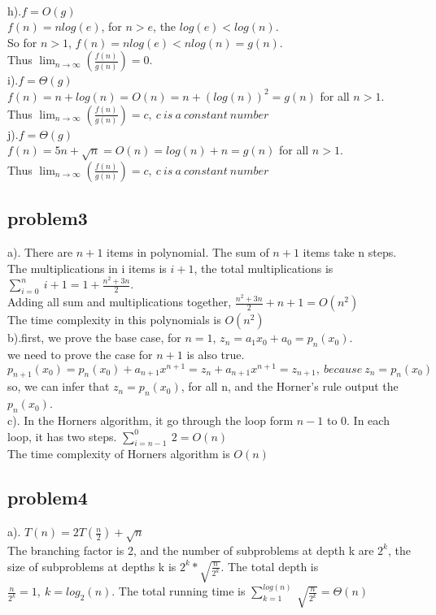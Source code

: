 \documentclass[11pt]{article}
\begin{document}
\\h).$f=O(g)$
\\$f(n)=nlog(e)$, for $n>e$, the $log(e)<log(n)$. 
\\So for $n>1$, $f(n)=nlog(e)<nlog(n)=g(n)$. 
\\Thus $\lim _{n\to \infty }\left(\frac{f\left(n\right)}{g\left(n\right)}\right)=0 $.
\\i).$f=\Theta(g)$
\\$f(n)=n+log(n)=O(n)=n+(log(n))^2=g(n)$ for all $n>1$.
\\Thus $\lim _{n\to \infty }\left(\frac{f\left(n\right)}{g\left(n\right)}\right)=c, \ c \ is \ a \ constant \ number $
\\j).$f=\Theta(g)$
\\$f(n)=5n+\sqrt{n}=O(n)=log(n)+n=g(n)$ for all $n>1$.
\\Thus $\lim _{n\to \infty }\left(\frac{f\left(n\right)}{g\left(n\right)}\right)=c, \ c \ is \ a \ constant \ number $

\subsection{problem3}
a). There are $n+1$ items in polynomial. The sum of $n+1$ items take n steps. The multiplications in i items is $i+1$, the total multiplications is $\sum _{i=0}^n\:i+1=1+\frac{n^2+3n}{2}$.
\\Adding all sum and multiplications together, $\frac{n^2+3n}{2}+n+1=O(n^2)$
\\The time complexity in this polynomials is $O(n^2)$
\\b).first, we prove the base case, for $n=1$, $z_n=a_1x_0+a_0=p_n(x_0)$.
\\we need to prove the case for $n+1$ is also true. $p_{n+1}(x_0)=p_n(x_0)+a_{n+1}x^{n+1}=z_n+a_{n+1}x^{n+1}=z_{n+1}, \ because \ z_n=p_n(x_0)$
\\so, we can infer that $z_n=p_n(x_0)$, for all n, and the Horner's rule output the $p_n(x_0)$.
\\c). In the Horners algorithm, it go through the loop form $n-1$ to 0. In each loop, it has two steps. $\sum _{i=n-1}^0\:2=O(n)$
\\The time complexity of Horners algorithm is $O(n)$

\subsection{problem4}
a). $T(n)=2T(\frac{n}{2})+\sqrt{n}$
\\The branching factor is 2, and the number of subproblems at depth k are $2^k$, the size of subproblems at depths k is $2^k*\sqrt{\frac{n}{2^k}}$. The total depth is $\frac{n}{2^k}=1, \  k=log_2(n)$. The total running time is $\sum _{k=1}^{log\left(n\right)}\:\sqrt{\frac{n}{2^k}}=\Theta(n)$
\end{document}
